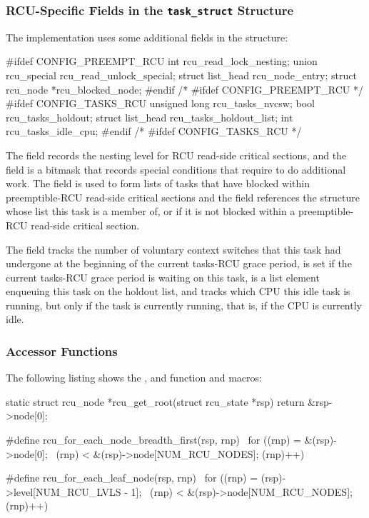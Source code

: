 \subsubsection{RCU-Specific Fields in the \texttt{task\_struct} Structure}

The  implementation uses some additional fields in
the  structure:

\begin{VerbatimN}
	#ifdef CONFIG_PREEMPT_RCU
		int rcu_read_lock_nesting;
		union rcu_special rcu_read_unlock_special;
		struct list_head rcu_node_entry;
		struct rcu_node *rcu_blocked_node;
	#endif /* #ifdef CONFIG_PREEMPT_RCU */
	#ifdef CONFIG_TASKS_RCU
		unsigned long rcu_tasks_nvcsw;
		bool rcu_tasks_holdout;
		struct list_head rcu_tasks_holdout_list;
		int rcu_tasks_idle_cpu;
	#endif /* #ifdef CONFIG_TASKS_RCU */
\end{VerbatimN}

The  field records the nesting level for RCU
read-side critical sections, and the  field
is a bitmask that records special conditions that require
 to do additional work.
The 
field is used to form lists of tasks that have blocked within
preemptible-RCU read-side critical sections and the
 field references the  structure whose
list this task is a member of, or  if it is not blocked within a
preemptible-RCU read-side critical section.

The  field tracks the number of voluntary context
switches that this task had undergone at the beginning of the current
tasks-RCU grace period,  is set if the current
tasks-RCU grace period is waiting on this task,
 is a list element enqueuing this task on
the holdout list, and  tracks which CPU this
idle task is running, but only if the task is currently running, that
is, if the CPU is currently idle.

\subsubsection{Accessor Functions}

The following listing shows the ,
 and 
function and macros:

\begin{VerbatimN}
	static struct rcu_node *rcu_get_root(struct rcu_state *rsp)
	{
		return &rsp->node[0];
	}

	#define rcu_for_each_node_breadth_first(rsp, rnp) \
	        for ((rnp) = &(rsp)->node[0]; \
	             (rnp) < &(rsp)->node[NUM_RCU_NODES]; (rnp)++)

	#define rcu_for_each_leaf_node(rsp, rnp) \
	        for ((rnp) = (rsp)->level[NUM_RCU_LVLS - 1]; \
	             (rnp) < &(rsp)->node[NUM_RCU_NODES]; (rnp)++)
\end{VerbatimN}

